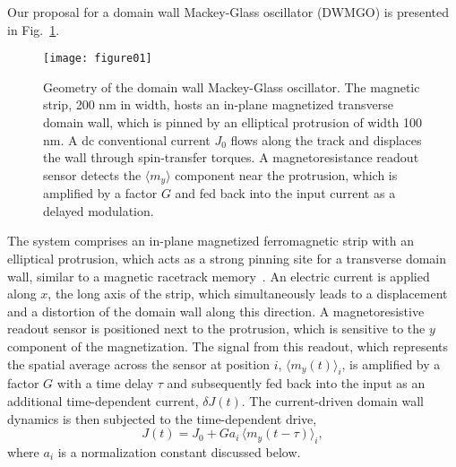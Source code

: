 \documentclass[aip,reprint,amsmath,amssymb,floatfix,superscriptaddress]{revtex4-1}
\begin{document}
Our proposal for a domain wall Mackey-Glass oscillator (DWMGO) is presented in Fig.~\ref{fig:Geometry}.
%
\begin{figure}
\centering\texttt{[image: figure01]}
\caption{Geometry of the domain wall Mackey-Glass oscillator. The magnetic strip, 200 nm in width, hosts an in-plane magnetized transverse domain wall, which is pinned by an elliptical protrusion of width 100 nm. A dc conventional current $J_0$ flows along the track and displaces the wall through spin-transfer torques. A magnetoresistance readout sensor detects the $\langle m_y \rangle$ component near the protrusion, which is amplified by a factor $G$ and fed back into the input current as a delayed modulation.}
\label{fig:Geometry}
\end{figure}
%
The system comprises an in-plane magnetized ferromagnetic strip with an elliptical protrusion, which acts as a strong pinning site for a transverse domain wall, similar to a magnetic racetrack memory~\cite{Parkin:2008gs}. An electric current is applied along $x$, the long axis of the strip, which simultaneously leads to a displacement and a distortion of the domain wall along this direction. A magnetoresistive readout sensor is positioned next to the protrusion, which is sensitive to the $y$ component of the magnetization. The signal from this readout, which represents the spatial average across the sensor at position $i$, $\langle m_y(t) \rangle_i$, is amplified by a factor $G$ with a time delay $\tau$ and subsequently fed back into the input as an additional time-dependent current, $\delta J(t)$. The current-driven domain wall dynamics is then subjected to the time-dependent drive,
%
\begin{equation}
J(t) = J_0 + G a_i \, \langle m_y(t-\tau) \rangle_i,
\label{eq:curr}
\end{equation}
%
where $a_i$ is a normalization constant discussed below.
\end{document}
